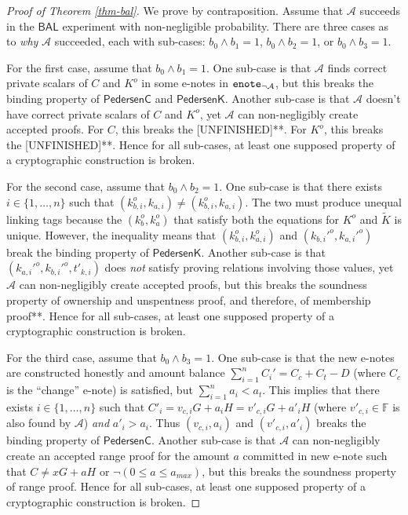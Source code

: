 \documentclass{article}
\theoremstyle{plain}
\theoremstyle{remark}
\begin{document}
\begin{proof}[Proof of Theorem \ref{thm-bal}]
We prove by contraposition. Assume that $\mathcal{A}$ succeeds in the $\textsf{BAL}$ experiment with non-negligible probability. There are three cases as to \textit{why} $\mathcal{A}$ succeeded, each with sub-cases: $b_0 \wedge b_1 = 1$, $b_0 \wedge b_2 = 1$, or $b_0 \wedge b_3 = 1$.

For the first case, assume that $b_0 \wedge b_1 = 1$. One sub-case is that $\mathcal{A}$ finds correct private scalars of $C$ and $K^o$ in some e-notes in ${\tt enote}_{\neg\mathcal{A}}$, but this breaks the binding property of $\textsf{PedersenC}$ and $\textsf{PedersenK}$. Another sub-case is that $\mathcal{A}$ doesn't have correct private scalars of $C$ and $K^o$, yet $\mathcal{A}$ can non-negligibly create accepted proofs. For $C$, this breaks the [UNFINISHED]**. For $K^o$, this breaks the [UNFINISHED]**. Hence for all sub-cases, at least one supposed property of a cryptographic construction is broken.

For the second case, assume that $b_0 \wedge b_2 = 1$. One sub-case is that there exists $i\in\{1,\ldots,n\}$ such that $(k_{b,i}^o, k_{a,i}) \ne (k_{b,i}^o, k_{a,i})$. The two must produce unequal linking tags because the $(k_b^o, k_a^o)$ that satisfy both the equations for $K^o$ and $\tilde{K}$ is unique. However, the inequality means that $(k_{b,i}^o, k_{a,i}^o)$ and $( k_{b,i}'^o, k_{a,i}'^o)$ break the binding property of $\textsf{PedersenK}$. Another sub-case is that $( k_{a,i}'^o, k_{b,i}'^o, t'_{k,i})$ does \textit{not} satisfy proving relations involving those values, yet $\mathcal{A}$ can non-negligibly create accepted proofs, but this breaks the soundness property of ownership and unspentness proof, and therefore, of membership proof**. Hence for all sub-cases, at least one supposed property of a cryptographic construction is broken.

For the third case, assume that $b_0 \wedge b_3= 1$. One sub-case is that the new e-notes are constructed honestly and amount balance $\sum_{i=1}^n{C_i'} = C_c + C_t - D$ (where $C_c$ is the ``change'' e-note) is satisfied, but $\sum_{i=1}^n{a_i} < a_t$. This implies that there exists $i\in\{1,\ldots,n\}$ such that $C'_i = v_{c,i} G + a_i H = v'_{c,i} G + a'_i H$ (where $v'_{c,i}\in\mathbb{F}$ is also found by $\mathcal{A}$) \textit{and} $a'_i > a_i$. Thus $( v_{c,i}, a_i)$ and $(v'_{c,i}, a'_i)$ breaks the binding property of $\textsf{PedersenC}$. Another sub-case is that $\mathcal{A}$ can non-negligibly create an accepted range proof for the amount $a$ committed in new e-note such that $C \ne x G + a H$ or $\neg (0 \le a \le a_{max})$, but this breaks the soundness property of range proof. Hence for all sub-cases, at least one supposed property of a cryptographic construction is broken.
\end{proof}
\end{document}
